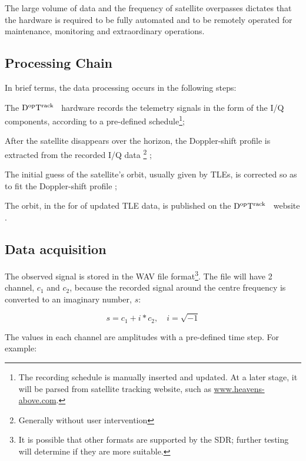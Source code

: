 \documentclass[11pt,a4paper,oneside]{article}
\newcommand{\GroundStationName}{${\rm D^{\rm op}T^{\rm rack}}$}
\newcommand{\listskip}{0pt}
\newenvironment{itemize*}
{\begin{itemize}
  \setlength{\itemsep}{\listskip}
  \setlength{\parskip}{\listskip}
  \setlength{\parsep}{\listskip}}
{\end{itemize}}
\newcommand{\footnoteremember}[2]{%
  \footnote{#2}%
  \newcounter{#1}%
  \setcounter{#1}{\value{footnote}}%
}
\newcommand{\footnoterecall}[1]{%
  \footnotemark[\value{#1}]%
}
\begin{document}
The large volume of data and the frequency of satellite overpasses dictates that the hardware is required to be fully automated and to be remotely operated for maintenance, monitoring and extraordinary operations.



\subsection{Processing Chain}

In brief terms, the data processing occurs in the following steps:

\begin{itemize*}
\item The \GroundStationName~ hardware records the telemetry signals in the form of the \ac{I/Q} components, according to a pre-defined schedule\footnote{The recording schedule is manually inserted and updated. At a later stage, it will be parsed from satellite tracking website, such as \url{www.heavens-above.com}.};
\item After the satellite disappears over the horizon, the Doppler-shift profile is extracted from the recorded \ac{I/Q} data\footnoteremember{nouserinterv}{Generally without user intervention};
\item The initial guess of the satellite's orbit, usually given by \acp{TLE}, is corrected so as to fit the Doppler-shift profile\footnoterecall{nouserinterv};
\item The orbit, in the for of updated \ac{TLE} data, is published on the \GroundStationName~ website\footnoterecall{nouserinterv}.
\end{itemize*}



\subsection{Data acquisition}

The observed signal is stored in the \ac{WAV} file format\footnote{It is possible that other formats are supported by the \ac{SDR}; further testing will determine if they are more suitable.}. The file will have 2 channel, $c_1$ and $c_2$, because the recorded signal around the centre frequency is converted to an imaginary number, $s$:

\begin{equation}
s = c_1 + i*c_2, \quad i=\sqrt{-1}
\end{equation}

The values in each channel are amplitudes with a pre-defined time step. For example:
\end{document}

